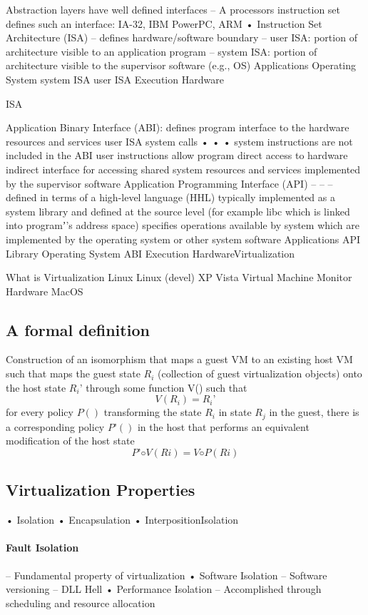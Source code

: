 \documentclass[10pt]{article}
\begin{document}
Abstraction layers have well defined interfaces
–  A processors instruction set defines such an interface: IA-32, IBM
PowerPC, ARM
•  Instruction Set Architecture (ISA)
–  defines hardware/software boundary
–  user ISA: portion of architecture visible to an application program
–  system ISA: portion of architecture visible to the supervisor software
(e.g., OS)
Applications
Operating
System
system ISA
user ISA
Execution
Hardware

ISA

Application Binary Interface (ABI): defines program interface to the hardware resources and services 
user ISA
system calls
• 
• 
• 
system instructions are not included in the ABI
user instructions allow program direct access to hardware
indirect interface for accessing shared system resources and services
implemented by the supervisor software
Application Programming Interface (API)
– 
– 
– 
defined in terms of a high-level language (HHL)
typically implemented as a system library and defined at the source level (for example libc which is linked
into programʼ’s address space)
specifies operations available by system which are implemented by the operating system or other system
software
Applications
API
Library
Operating
System
ABI
Execution
HardwareVirtualization

What is Virtualization
Linux
Linux
(devel)
XP
Vista
Virtual Machine Monitor
Hardware
MacOS

\subsection{A formal definition}


Construction of an isomorphism that maps a guest VM to an
existing host VM such that maps the guest state $R_i$ (collection
of guest virtualization objects) onto the host state $R_i’$ through some function V() such that 
$$V(R_i) = R_i’$$
for every policy $P()$ transforming the
state $R_i$ in state $R_j$ in the guest, there
is a corresponding policy $P’()$ in the
host that performs an equivalent
modification of the host state
$$P’ ◦ V(R i )=V ◦ P(R i )$$

\subsection{Virtualization Properties}

•  Isolation
•  Encapsulation
•  InterpositionIsolation


\paragraph{Fault Isolation}
–  Fundamental property of virtualization
•  Software Isolation
–  Software versioning
–  DLL Hell
•  Performance Isolation
–  Accomplished through scheduling and resource
allocation
\end{document}
